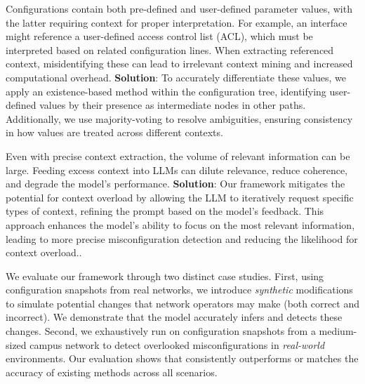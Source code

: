 Configurations contain both pre-defined and user-defined parameter values,
with the latter requiring context for proper interpretation. For example, an
interface might reference a user-defined access control list (ACL), which must
be interpreted based on related configuration lines. When extracting
referenced context, misidentifying these can lead to irrelevant context mining
and increased computational overhead. \textbf{Solution}: To accurately
differentiate these values, we apply an existence-based method within the
configuration tree, identifying user-defined values by their presence as
intermediate nodes in other paths. Additionally, we use majority-voting to
resolve ambiguities, ensuring consistency in how values are treated across
different contexts.

Even with precise context extraction, the volume of relevant information can
be large. 
Feeding excess context into LLMs can dilute relevance, reduce coherence, and degrade the model’s performance.
\textbf{Solution}: Our framework mitigates the potential for context overload
by allowing the LLM to iteratively request specific types of context, refining
the prompt based on the model’s feedback. This approach enhances the model’s
ability to focus on the most relevant information, leading to more precise
misconfiguration detection and reducing the likelihood for context overload..

We evaluate our framework through two distinct case studies.
First, using configuration snapshots from real networks, we introduce {\em synthetic} modifications to simulate potential changes that network operators may make (both correct and incorrect). We demonstrate that the model accurately infers and detects these changes. 
Second, we exhaustively run \sysname{} on configuration snapshots from a medium-sized campus network to detect overlooked misconfigurations in {\em real-world} environments. Our evaluation shows that \sysname{} consistently outperforms or matches the accuracy of existing methods across all scenarios.
